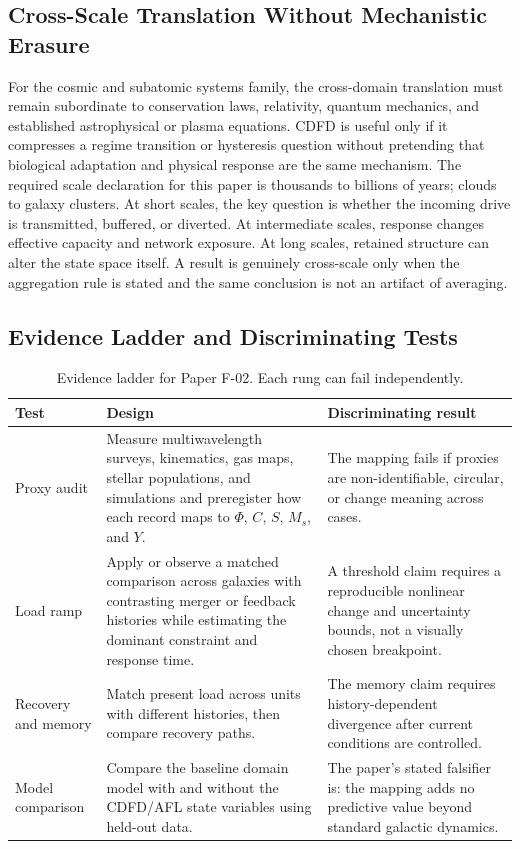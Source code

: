 \documentclass[11pt,a4paper]{article}
\begin{document}
\subsection{Cross-Scale Translation Without Mechanistic Erasure}

For the cosmic and subatomic systems family, the cross-domain translation must remain subordinate to conservation laws, relativity, quantum mechanics, and established astrophysical or plasma equations. CDFD is useful only if it compresses a regime transition or hysteresis question without pretending that biological adaptation and physical response are the same mechanism. \cite{Turing1952,Shannon1948,BakTangWiesenfeld1987}
The required scale declaration for this paper is thousands to billions of years; clouds to galaxy clusters. At short
scales, the key question is whether the incoming drive is transmitted,
buffered, or diverted. At intermediate scales, response changes effective
capacity and network exposure. At long scales, retained structure can alter the
state space itself. A result is genuinely cross-scale only when the aggregation
rule is stated and the same conclusion is not an artifact of averaging.

\subsection{Evidence Ladder and Discriminating Tests}

\begin{table}[htbp]
\centering
\small
\caption{Evidence ladder for Paper F-02. Each rung can fail independently.}
\begin{tabularx}{\textwidth}{|p{}|X|X|}
\hline
\textbf{Test} & \textbf{Design} & \textbf{Discriminating result} \\
\hline
Proxy audit & Measure multiwavelength surveys, kinematics, gas maps, stellar populations, and simulations and preregister how each record maps to $\Phi$, $C$, $S$, $M_s$, and $Y$. & The mapping fails if proxies are non-identifiable, circular, or change meaning across cases. \\
\hline
Load ramp & Apply or observe a matched comparison across galaxies with contrasting merger or feedback histories while estimating the dominant constraint and response time. & A threshold claim requires a reproducible nonlinear change and uncertainty bounds, not a visually chosen breakpoint. \\
\hline
Recovery and memory & Match present load across units with different histories, then compare recovery paths. & The memory claim requires history-dependent divergence after current conditions are controlled. \\
\hline
Model comparison & Compare the baseline domain model with and without the CDFD/AFL state variables using held-out data. & The paper's stated falsifier is: the mapping adds no predictive value beyond standard galactic dynamics. \\
\hline
\end{tabularx}
\end{table}
\end{document}

